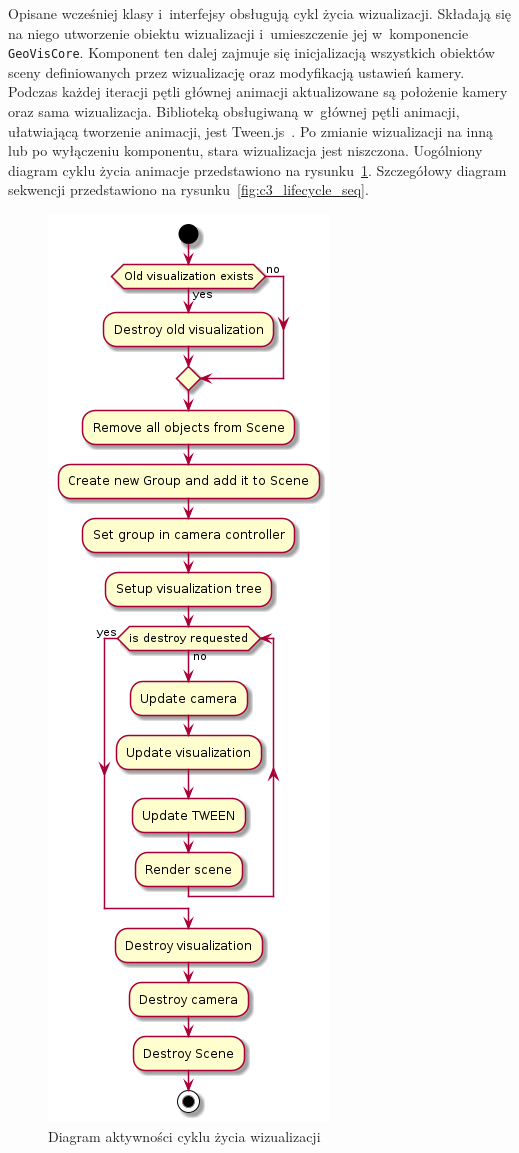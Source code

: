 Opisane wcześniej klasy i~interfejsy obsługują cykl życia wizualizacji. Składają się na niego utworzenie obiektu wizualizacji i~umieszczenie jej w~komponencie \texttt{GeoVisCore}. Komponent ten dalej zajmuje się inicjalizacją wszystkich obiektów sceny definiowanych przez wizualizację oraz modyfikacją ustawień kamery. Podczas każdej iteracji pętli głównej animacji aktualizowane są położenie kamery oraz sama wizualizacja. Biblioteką obsługiwaną w~głównej pętli animacji, ułatwiającą tworzenie animacji, jest Tween.js~\cite{TWEEN}. Po zmianie wizualizacji na inną lub po wyłączeniu komponentu, stara wizualizacja jest niszczona. Uogólniony diagram cyklu życia animacje przedstawiono na rysunku~\ref{fig:c3_lifecycle}. Szczegółowy diagram sekwencji przedstawiono na rysunku~\ref{fig:c3_lifecycle_seq}. 

\begin{figure}
    \centering
    \includegraphics[scale=0.6]{diagrams/out/c3_lifecycle.png}
    \caption{Diagram aktywności cyklu życia wizualizacji}
    \label{fig:c3_lifecycle}
\end{figure}

